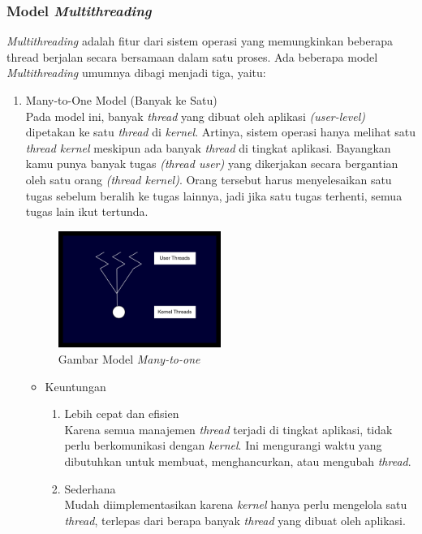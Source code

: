 \documentclass[12pt]{article}
\begin{document}
\subsubsection{Model \textit{Multithreading}}
\textit{Multithreading} adalah fitur dari sistem operasi yang memungkinkan beberapa thread berjalan secara bersamaan dalam satu proses.
Ada beberapa model \textit{Multithreading} umumnya dibagi menjadi tiga, yaitu:
\begin{enumerate}
    \item Many-to-One Model (Banyak ke Satu)\\
    Pada model ini, banyak \textit{thread} yang dibuat oleh aplikasi \textit{(user-level)} dipetakan ke satu \textit{thread} di \textit{kernel}. Artinya, sistem operasi hanya melihat satu \textit{thread kernel} meskipun ada banyak \textit{thread} di tingkat aplikasi.
    Bayangkan kamu punya banyak tugas \textit{(thread user)} yang dikerjakan secara bergantian oleh satu orang \textit{(thread kernel)}. Orang tersebut harus menyelesaikan satu tugas sebelum beralih ke tugas lainnya, jadi jika satu tugas terhenti, semua tugas lain ikut tertunda.
    \begin{figure}[h]
        \centering
        \includegraphics[width=0.5\textwidth]{asset/gambar-model-multithreading-many-to-one.jpg}
        \caption{Gambar Model \textit{Many-to-one}}
    \end{figure}
    \begin{itemize}
        \item Keuntungan \\
            \begin{enumerate}
                \item Lebih cepat dan efisien \\
                    Karena semua manajemen \textit{thread} terjadi di tingkat aplikasi, tidak perlu 
                    berkomunikasi dengan \textit{kernel}. Ini mengurangi waktu yang dibutuhkan untuk membuat, menghancurkan, atau mengubah \textit{thread}.
                \item Sederhana \\
                    Mudah diimplementasikan karena \textit{kernel} hanya perlu mengelola satu \textit{thread}, terlepas dari berapa banyak \textit{thread} yang 
                    dibuat oleh aplikasi.
            \end{enumerate}


\end{itemize}
\end{enumerate}
\end{document}

